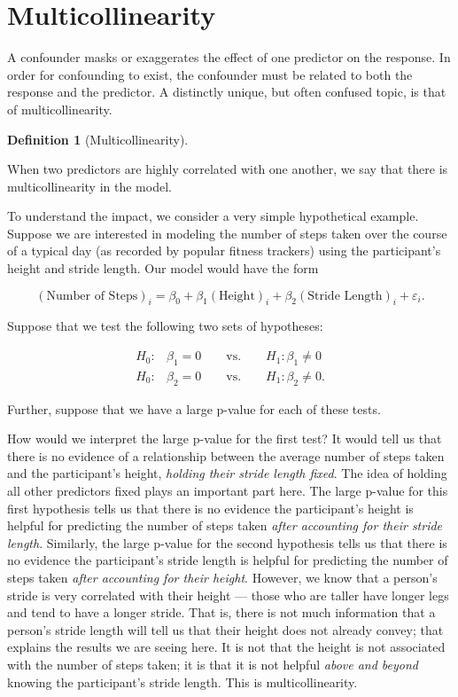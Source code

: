 \documentclass[
  letterpaper,
  DIV=11,
  numbers=noendperiod]{scrreprt}
\theoremstyle{definition}
\theoremstyle{definition}
\newtheorem{definition}{Definition}[chapter]
\theoremstyle{remark}
\begin{document}
\hypertarget{multicollinearity}{%
\section{Multicollinearity}\label{multicollinearity}}

A confounder masks or exaggerates the effect of one predictor on the
response. In order for confounding to exist, the confounder must be
related to both the response and the predictor. A distinctly unique, but
often confused topic, is that of multicollinearity.

\begin{definition}[Multicollinearity]\protect\hypertarget{def-multicollinearity}{}\label{def-multicollinearity}

When two predictors are highly correlated with one another, we say that
there is multicollinearity in the model.

\end{definition}

To understand the impact, we consider a very simple hypothetical
example. Suppose we are interested in modeling the number of steps taken
over the course of a typical day (as recorded by popular fitness
trackers) using the participant's height and stride length. Our model
would have the form

\[(\text{Number of Steps})_i = \beta_0 + \beta_1(\text{Height})_i + \beta_2(\text{Stride Length})_i + \varepsilon_i.\]

Suppose that we test the following two sets of hypotheses:

\[
\begin{aligned}
  H_0:& \beta_1 = 0 \qquad \text{vs.} \qquad H_1: \beta_1 \neq 0 \\
  H_0:& \beta_2 = 0 \qquad \text{vs.} \qquad H_1: \beta_2 \neq 0.
\end{aligned}
\]

Further, suppose that we have a large p-value for each of these tests.

How would we interpret the large p-value for the first test? It would
tell us that there is no evidence of a relationship between the average
number of steps taken and the participant's height, \emph{holding their
stride length fixed}. The idea of holding all other predictors fixed
plays an important part here. The large p-value for this first
hypothesis tells us that there is no evidence the participant's height
is helpful for predicting the number of steps taken \emph{after
accounting for their stride length}. Similarly, the large p-value for
the second hypothesis tells us that there is no evidence the
participant's stride length is helpful for predicting the number of
steps taken \emph{after accounting for their height}. However, we know
that a person's stride is very correlated with their height --- those
who are taller have longer legs and tend to have a longer stride. That
is, there is not much information that a person's stride length will
tell us that their height does not already convey; that explains the
results we are seeing here. It is not that the height is not associated
with the number of steps taken; it is that it is not helpful \emph{above
and beyond} knowing the participant's stride length. This is
multicollinearity.
\end{document}
